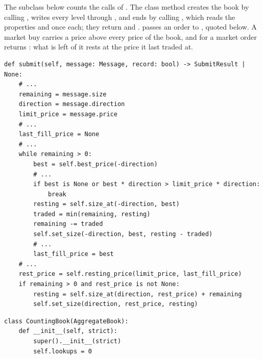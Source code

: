 \begin{question}
\label{question.lookupsCountedThroughTheInheritedMatching}
The subclass below counts the calls of .
The class method  creates the book by calling ,
writes every level through ,
and ends by calling ,
which reads the properties  and  once each;
they return  and .
 passes an order to , quoted below.
A market buy carries a price above every price of the book,
and for a market order  returns :
what is left of it rests at the price it last traded at.
\begin{lstlisting}[caption={\protect\codehl{unito26.lob.orderbook.AggregateBook.submit}, abridged: the recording of fills and of level changes is cut.}, label=listing.lookupsCountedThroughTheInheritedMatchingSubmit]
def submit(self, message: Message, record: bool) -> SubmitResult | None:
    # ...
    remaining = message.size
    direction = message.direction
    limit_price = message.price
    # ...
    last_fill_price = None
    # ...
    while remaining > 0:
        best = self.best_price(-direction)
        # ...
        if best is None or best * direction > limit_price * direction:
            break
        resting = self.size_at(-direction, best)
        traded = min(remaining, resting)
        remaining -= traded
        self.set_size(-direction, best, resting - traded)
        # ...
        last_fill_price = best
    # ...
    rest_price = self.resting_price(limit_price, last_fill_price)
    if remaining > 0 and rest_price is not None:
        resting = self.size_at(direction, rest_price) + remaining
        self.set_size(direction, rest_price, resting)
\end{lstlisting}
\begin{lstlisting}[caption={A book that counts its lookups}, label=listing.lookupsCountedThroughTheInheritedMatchingClass]
class CountingBook(AggregateBook):
    def __init__(self, strict):
        super().__init__(strict)
        self.lookups = 0


\end{lstlisting}
\end{question}
